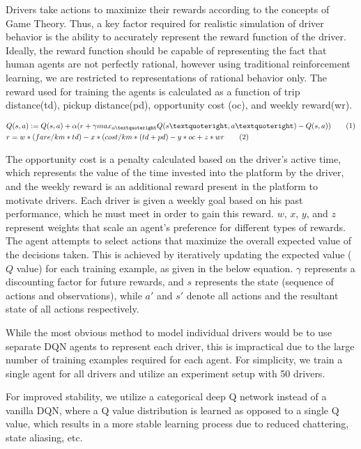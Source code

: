 \documentclass[runningheads]{llncs}
\begin{document}
Drivers take actions to maximize their rewards according to the concepts of Game Theory. Thus, a key factor required for realistic simulation of driver behavior is the ability to accurately represent the reward function of the driver. Ideally, the reward function should be capable of representing the fact that human agents are not perfectly rational, however using traditional reinforcement learning, we are restricted to representations of rational behavior only. The reward used for training the agents is calculated as a function of trip distance(td), pickup distance(pd), opportunity cost (oc), and weekly reward(wr).

\begin{align*}
&Q(s, a) := Q(s,a) + \alpha( r + \gamma max_{a’}Q(s’, a’)  - Q(s, a))
\stepcounter{equation}\tag{\theequation}\label{eq1} \\
&r = w*(fare/km * td) - x*(cost/km * (td + pd) - y*oc + z*wr \stepcounter{equation}\tag{\theequation}\label{eq2} \\
\end{align*}

The opportunity cost is a penalty calculated based on the driver’s active time, which represents the value of the time invested into the platform by the driver, and the weekly reward is an additional reward present in the platform to motivate drivers. Each driver is given a weekly goal based on his past performance, which he must meet in order to gain this reward. \(w\), \(x\), \(y\), and \(z\) represent weights that scale an agent's preference for different types of rewards. The agent attempts to select actions that maximize the overall expected value of the decisions taken. This is achieved by iteratively updating the expected value (\(Q\) value) for each training example, as given in the below equation. \(\gamma\) represents a discounting factor for future rewards, and \(s\) represents the state (sequence of actions and observations), while \(a'\) and \(s'\) denote all actions and the resultant state of all actions respectively. \cite{Hausknecht2015DeepRQ}

While the most obvious method to model individual drivers would be to use separate DQN agents to represent each driver, this is impractical due to the large number of training examples required for each agent. For simplicity, we train a single agent for all drivers and utilize an experiment setup with 50 drivers.

For improved stability, we utilize a categorical deep Q network \cite{bellemare2017} instead of a vanilla DQN, where a Q value distribution is learned as opposed to a single Q value, which results in a more stable learning process due to reduced chattering, state aliasing, etc.
\end{document}
